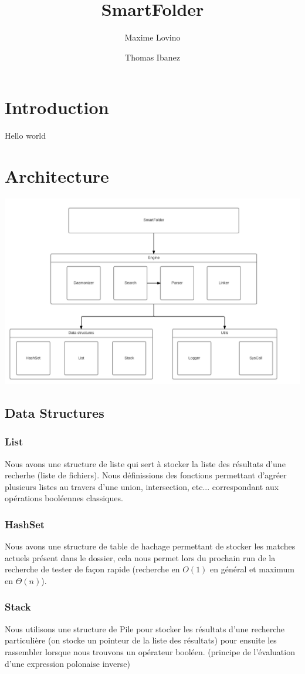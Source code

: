 \documentclass[a4paper]{article}
\title{SmartFolder}
\author{Maxime Lovino \and Thomas Ibanez}
\begin{document}
\maketitle
\newpage
\section{Introduction}
Hello world
\section{Architecture}
\includegraphics[width=\textwidth]{diagram.png}
\subsection{Data Structures}
\subsubsection{List}
Nous avons une structure de liste qui sert à stocker la liste des résultats d'une recherhe (liste de fichiers). Nous définissions des fonctions permettant d'agréer plusieurs listes au travers d'une union, intersection, etc... correspondant aux opérations booléennes classiques.
\subsubsection{HashSet}
Nous avons une structure de table de hachage permettant de stocker les matches actuels présent dans le dossier, cela nous permet lors du prochain run de la recherche de tester de façon rapide (recherche en $O(1)$ en général et maximum en $\Theta(n)$).
\subsubsection{Stack}
Nous utilisons une structure de Pile pour stocker les résultats d'une recherche particulière (on stocke un pointeur de la liste des résultats) pour ensuite les rassembler lorsque nous trouvons un opérateur booléen. (principe de l'évaluation d'une expression polonaise inverse)
\newpage
\end{document}
